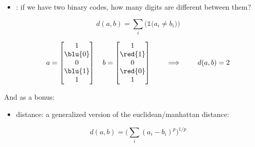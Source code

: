 \begin{itemize}
            \item {}: if we have two binary codes, how many digits are different between them?

                \begin{equation}
                    d(a,b) = \sum_i \Big( \mathbb{1} \big( a_i \neq b_i) \Big)
                \end{equation}

                \begin{equation}
                    a = \begin{bmatrix}
                        1 \\ \blu{0} \\ 0 \\ \blu{1} \\ 1 
                    \end{bmatrix}
                    \quad
                    b = \begin{bmatrix}
                        1 \\ \red{1} \\ 0 \\ \red{0} \\ 1 
                    \end{bmatrix}
                    \qquad\implies\qquad 
                    d(a,b)=2
                \end{equation}
        \end{itemize}

        And as a bonus:

        \begin{itemize}
            \item {} distance: a generalized version of the euclidean/manhattan distance: 

                \begin{equation}
                    d(a,b) = \Big( \sum_i (a_i-b_i)^p \Big)^{1/p}
                \end{equation}
        \end{itemize}


    


        










\pagebreak


